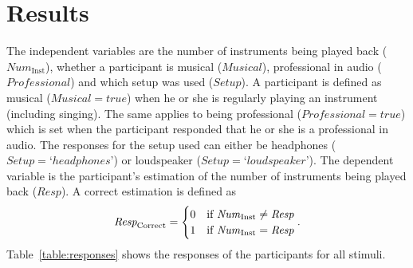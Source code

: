 \section{Results}\label{sec:results}

The independent variables are the number of instruments being played back ($\textit{Num}_{\mathrm{Inst}}$), whether a participant is musical ($\textit{Musical}$), professional in audio ($\textit{Professional}$) and which setup was used ($\textit{Setup}$). A participant is defined as musical ($\textit{Musical} = true$) when he or she is regularly playing an instrument (including singing). The same applies to being professional ($\textit{Professional} = true$) which is set when the participant responded that he or she is a professional in audio. The responses for the setup used can either be headphones ($\textit{Setup} = \textrm{`}headphones\textrm{'}$) or loudspeaker ($\textit{Setup} = \textrm{`}loudspeaker\textrm{'}$). The dependent variable is the participant's estimation of the number of instruments being played back ($\textit{Resp}$). A correct estimation is defined as
\begin{equation}
\label{equation:response_correct}
\textit{Resp}_{\mathrm{Correct}} =
\begin{cases}
0 & \text{if } \text{\textit{Num}}_{\mathrm{Inst}} \neq \text{\textit{Resp}}
\\
1 & \text{if } \text{\textit{Num}}_{\mathrm{Inst}} = \text{\textit{Resp}}
\end{cases}
\mathrm{.}
\end{equation}
Table~\ref{table:responses} shows the responses of the participants for all stimuli.
\tabcolsep=5.5pt
